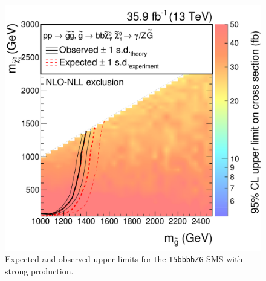 \begin{figure}[tbp]
 \centering
 \includegraphics[width=\pairwidth]{figures/EndorsementPlots/T5bbbbZg_limits_XSEC2}
 \caption{Expected and observed upper limits for the \texttt{T5bbbbZG} SMS with strong production.}
 \label{fig:limitStrong}
\end{figure}
